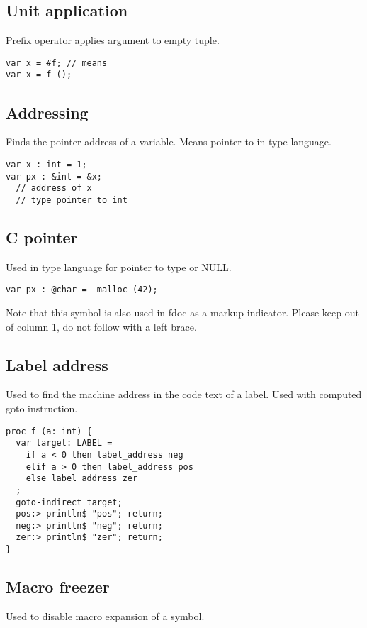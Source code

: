 \documentclass[oneside]{book}
\begin{document}
\subsection{Unit application}
Prefix operator applies argument to empty tuple.

\begin{verbatim}
var x = #f; // means
var x = f ();
\end{verbatim}


\subsection{Addressing}
Finds the pointer address of a variable.
Means pointer to in type language.

\begin{verbatim}
var x : int = 1;
var px : &int = &x; 
  // address of x
  // type pointer to int
\end{verbatim}


\subsection{C pointer}
Used in type language for pointer to type or NULL.

\begin{verbatim}
var px : @char =  malloc (42);
\end{verbatim}


Note that this symbol is also used in fdoc as a markup
indicator. Please keep out of column 1, do not follow
with a left brace.

\subsection{Label address}
Used to find the machine address in the code text of
a label. Used with computed goto instruction.

\begin{verbatim}
proc f (a: int) {
  var target: LABEL = 
    if a < 0 then label_address neg
    elif a > 0 then label_address pos
    else label_address zer
  ;
  goto-indirect target;
  pos:> println$ "pos"; return;
  neg:> println$ "neg"; return;
  zer:> println$ "zer"; return;
}
\end{verbatim}


\subsection{Macro freezer}
Used to disable macro expansion of a symbol.
\end{document}
